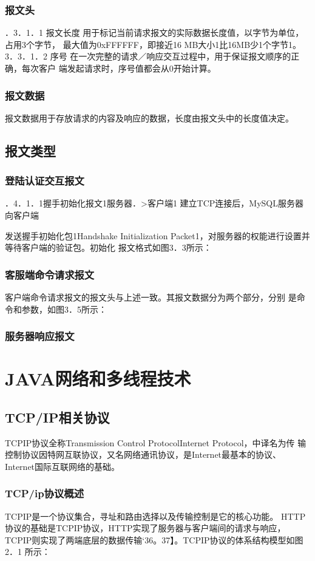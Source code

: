 \subsubsection*{报文头}
．3．1．1
报文长度
用于标记当前请求报文的实际数据长度值，以字节为单位，占用3个字节，
最大值为0xFFFFFF，即接近16 MB大小1比16MB少1个字节1。
3．3．1．2 序号
在一次完整的请求／响应交互过程中，用于保证报文顺序的正确，每次客户
端发起请求时，序号值都会从0开始计算。
\subsubsection*{报文数据}
报文数据用于存放请求的内容及响应的数据，长度由报文头中的长度值决定。
\subsection{报文类型}
\subsubsection*{登陆认证交互报文}
．4．1．1握手初始化报文1服务器．>客户端1
建立TCP连接后，MySQL服务器向客户端

发送握手初始化包1Handshake
Initialization Packet1，对服务器的权能进行设置并等待客户端的验证包。初始化
报文格式如图3．3所示：

\subsubsection*{客服端命令请求报文}
客户端命令请求报文的报文头与上述一致。其报文数据分为两个部分，分别
是命令和参数，如图3．5所示：
\subsubsection*{服务器响应报文}
\section*{JAVA网络和多线程技术}
\subsection*{TCP/IP相关协议}
TCPIP协议全称Transmission Control ProtocolInternet Protocol，中译名为传
输控制协议因特网互联协议，又名网络通讯协议，是Internet最基本的协议、
Internet国际互联网络的基础。
\subsubsection*{TCP/ip协议概述}
TCPIP是一个协议集合，寻址和路由选择以及传输控制是它的核心功能。
HTTP协议的基础是TCPIP协议，HTTP实现了服务器与客户端间的请求与响应，
TCPIP则实现了两端底层的数据传输‘36。37】。TCPIP协议的体系结构模型如图2．1
所示：

